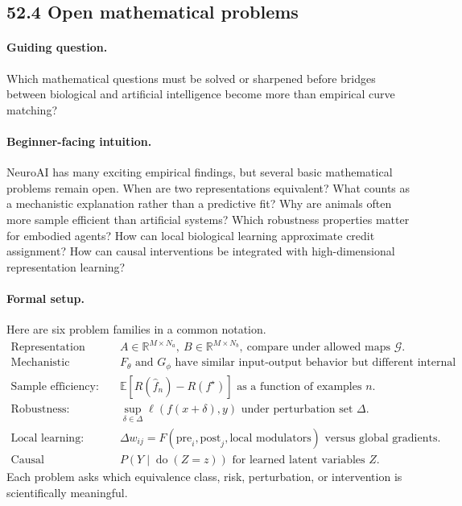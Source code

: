 \subsection{52.4 Open mathematical problems}

\paragraph{Guiding question.}
Which mathematical questions must be solved or sharpened before bridges between biological and artificial intelligence become more than empirical curve matching?

\paragraph{Beginner-facing intuition.}
NeuroAI has many exciting empirical findings, but several basic mathematical problems remain open. When are two representations equivalent? What counts as a mechanistic explanation rather than a predictive fit? Why are animals often more sample efficient than artificial systems? Which robustness properties matter for embodied agents? How can local biological learning approximate credit assignment? How can causal interventions be integrated with high-dimensional representation learning?

\paragraph{Formal setup.}
Here are six problem families in a common notation.
\[
\begin{array}{ll}
\text{Representation alignment:} & A\in\mathbb R^{M\times N_a},\ B\in\mathbb R^{M\times N_b},\ \text{compare under allowed maps } \mathcal G.\\
\text{Mechanistic equivalence:} & F_\theta \text{ and } G_\phi \text{ have similar input-output behavior but different internal states.}\\
\text{Sample efficiency:} & \mathbb E[R(\widehat f_n)-R(f^\star)] \text{ as a function of examples } n.\\
\text{Robustness:} & \sup_{\delta\in\Delta}\ell(f(x+\delta),y) \text{ under perturbation set } \Delta.\\
\text{Local learning:} & \Delta w_{ij}=F(\text{pre}_i,\text{post}_j,\text{local modulators}) \text{ versus global gradients.}\\
\text{Causal interpretability:} & P(Y\mid \operatorname{do}(Z=z)) \text{ for learned latent variables } Z.
\end{array}
\]
Each problem asks which equivalence class, risk, perturbation, or intervention is scientifically meaningful.

